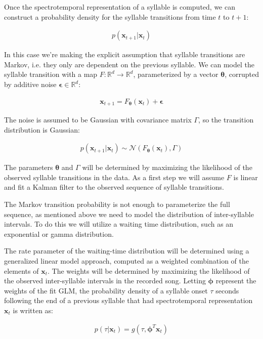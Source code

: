 Once the spectrotemporal representation of a syllable is computed, we can construct a probability
density for the syllable transitions from time $t$ to $t+1$:

\begin{align}
p \left( \bm{x}_{t+1} | \bm{x}_{t} \right)
\end{align}

In this case we're making the explicit assumption that syllable transitions are Markov, i.e.
they only are dependent on the previous syllable. We can model the syllable transition with
a map $F:\mathbb{R}^d \rightarrow \mathbb{R}^d$, parameterized by a vector $\bm{\theta}$,
corrupted by additive noise $\bm{\epsilon} \in \mathbb{R}^d$:

\begin{align}
\bm{x}_{t+1} = F_{\bm{\theta}}  \left( \bm{x}_{t} \right) + \bm{\epsilon}
\end{align}

The noise is assumed to be Gaussian with covariance matrix $\Gamma$, so the transition distribution is Gaussian:

\begin{align}
p \left( \bm{x}_{t+1} | \bm{x}_{t} \right) \sim \mathcal{N} \left( F_{\bm{\theta}} \left( \bm{x}_{t} \right), \Gamma \right)
\end{align}

The parameters $\bm{\theta}$ and $\Gamma$ will be determined by maximizing the likelihood of the
observed syllable transitions in the data. As a first step we will assume $F$ is linear and fit
a Kalman filter to the observed sequence of syllable transitions.

The Markov transition probability is not enough to parameterize the full sequence, as mentioned
above we need to model the distribution of inter-syllable intervals. To do this we will utilize
a waiting time distribution, such as an exponential or gamma distribution.

The rate parameter of the waiting-time distribution will be determined using a generalized linear model approach,
computed as a weighted combination of the elements of $\bm{x}_t$. The weights will be determined
by maximizing the likelihood of the observed inter-syllable intervals in the recorded song. Letting
$\bm{\phi}$ represent the weights of the fit GLM, the probability density of a syllable onset $\tau$
seconds following the end of a previous syllable that had spectrotemporal representation $\bm{x}_t$ is
written as:

\begin{align}
p \left( \tau | \bm{x}_t \right) = g \left( \tau, \bm{\phi}^T \bm{x}_t \right)
\end{align}

